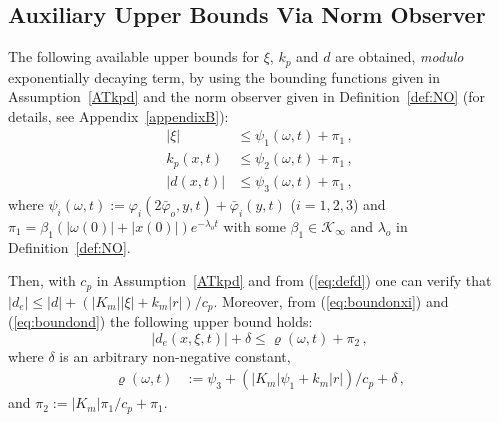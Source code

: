 \documentclass{rncauth}
\begin{document}
\subsection{Auxiliary Upper Bounds Via Norm Observer}
The following available upper bounds for $\xi$, $k_p$ and $d$ are
obtained, {\em modulo} exponentially decaying term, by using the
bounding functions given in Assumption~\ref{ATkpd} and the norm
observer given in Definition~\ref{def:NO} (for details, see
Appendix~\ref{appendixB}):
%
\begin{align}
|\xi| &\leq \psi_1(\omega,t)+\pi_1\,,
\label{eq:boundonxi}\\
k_p(x,t) &\leq \psi_2(\omega,t)+\pi_1\,,
\label{eq:boundonkp}\\
|d(x,t)| &\leq \psi_3(\omega,t)+\pi_1\,,\label{eq:boundond}
\end{align}
%
where
$\psi_i(\omega,t):=\varphi_i(2\bar{\varphi}_o,y,t)+\bar{\varphi}_i(y,t)$
($i=1,2,3$) and $\pi_1=\beta_1(|\omega(0)|+|x(0)|)e^{-\lambda_o
t}$ with some $\beta_1 \in \mathcal{K}_\infty$ and $\lambda_o$ in
Definition~\ref{def:NO}.


Then, with $c_p$ in Assumption~\ref{ATkpd} and from
(\ref{eq:defd}) one can verify that $|d_e|\leq |d| + (|K_m| |\xi|
+ k_m |r|)/c_p$. Moreover, from (\ref{eq:boundonxi}) and
(\ref{eq:boundond}) the following upper bound holds:
%
\begin{equation}\label{eq:boundonde}
|d_e(x,\xi,t)| + \delta \leq \varrho(\omega,t) + \pi_2\,,
\end{equation}
%
where $\delta$ is an arbitrary non-negative constant,
%
\begin{align}
\varrho(\omega,t)&:=\psi_3+(|K_m| \psi_1+k_m |r|)/c_p+
\delta\,,\label{eq:defvarrho}
\end{align}
%
and $\pi_2:=|K_m| \pi_1/c_p +\pi_1$.



\end{document}
